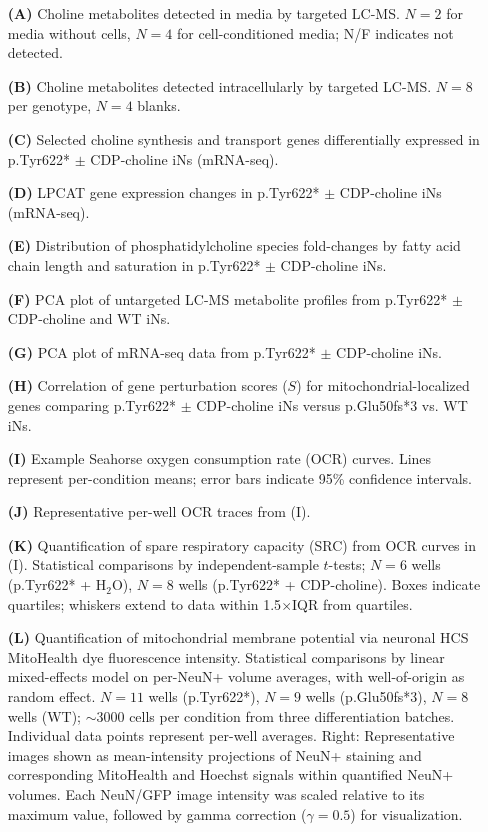 \documentclass[12pt]{article}
\begin{document}
\begin{itemize}
    \item[\textbf{(A)}] Choline metabolites detected in media by targeted LC-MS. $N=2$ for media without cells, $N=4$ for cell-conditioned media; N/F indicates not detected.
    \item[\textbf{(B)}] Choline metabolites detected intracellularly by targeted LC-MS. $N=8$ per genotype, $N=4$ blanks.
    \item[\textbf{(C)}] Selected choline synthesis and transport genes differentially expressed in p.Tyr622* $\pm$ CDP-choline iNs (mRNA-seq).
    \item[\textbf{(D)}] LPCAT gene expression changes in p.Tyr622* $\pm$ CDP-choline iNs (mRNA-seq).
    \item[\textbf{(E)}] Distribution of phosphatidylcholine species fold-changes by fatty acid chain length and saturation in p.Tyr622* $\pm$ CDP-choline iNs.
    \item[\textbf{(F)}] PCA plot of untargeted LC-MS metabolite profiles from p.Tyr622* $\pm$ CDP-choline and WT iNs.
    \item[\textbf{(G)}] PCA plot of mRNA-seq data from p.Tyr622* $\pm$ CDP-choline iNs.
    \item[\textbf{(H)}] Correlation of gene perturbation scores ($S$) for mitochondrial-localized genes comparing p.Tyr622* $\pm$ CDP-choline iNs versus p.Glu50fs*3 vs. WT iNs.
    \item[\textbf{(I)}] Example Seahorse oxygen consumption rate (OCR) curves. Lines represent per-condition means; error bars indicate 95\% confidence intervals.
    \item[\textbf{(J)}] Representative per-well OCR traces from (I).
    \item[\textbf{(K)}] Quantification of spare respiratory capacity (SRC) from OCR curves in (I). Statistical comparisons by independent-sample $t$-tests; $N=6$ wells (p.Tyr622* + H$_2$O), $N=8$ wells (p.Tyr622* + CDP-choline). Boxes indicate quartiles; whiskers extend to data within 1.5$\times$IQR from quartiles.
    \item[\textbf{(L)}] Quantification of mitochondrial membrane potential via neuronal HCS MitoHealth dye fluorescence intensity. Statistical comparisons by linear mixed-effects model on per-NeuN+ volume averages, with well-of-origin as random effect. $N=11$ wells (p.Tyr622*), $N=9$ wells (p.Glu50fs*3), $N=8$ wells (WT); $\sim3000$ cells per condition from three differentiation batches. Individual data points represent per-well averages. Right: Representative images shown as mean-intensity projections of NeuN+ staining and corresponding MitoHealth and Hoechst signals within quantified NeuN+ volumes. Each NeuN/GFP image intensity was scaled relative to its maximum value, followed by gamma correction ($\gamma = 0.5$) for visualization.
\end{itemize} \clearpage
\end{document}
